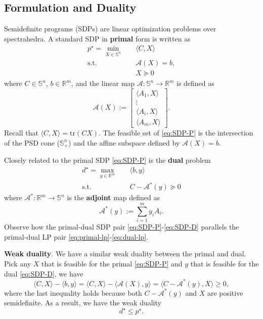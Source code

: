 \documentclass[
]{book}
\theoremstyle{definition}
\theoremstyle{definition}
\theoremstyle{definition}
\theoremstyle{definition}
\theoremstyle{remark}
\begin{document}
\hypertarget{formulation-and-duality}{%
\subsection{Formulation and Duality}\label{formulation-and-duality}}

Semidefinite programs (SDPs) are linear optimization problems over spectrahedra. A standard SDP in \textbf{primal} form is written as
\begin{equation}
\boxed{
\begin{split}
p^\star = \min_{X \in \mathbb{S}^{n}} & \quad \langle C, X \rangle \\
\mathrm{s.t.}& \quad \mathcal{A}(X) = b, \\
& \quad X \succeq 0
\end{split}
}
\label{eq:SDP-P}
\end{equation}
where \(C \in \mathbb{S}^{n}\), \(b \in \mathbb{R}^{m}\), and the linear map \(\mathcal{A}: \mathbb{S}^{n} \rightarrow \mathbb{R}^{m}\) is defined as
\[
\mathcal{A}(X) := \begin{bmatrix} \langle A_1, X \rangle \\
\vdots \\ \langle A_i, X \rangle \\ \langle A_m, X \rangle \end{bmatrix}.
\]
Recall that \(\langle C, X \rangle = \mathrm{tr}(CX)\). The feasible set of \eqref{eq:SDP-P} is the intersection of the PSD cone (\(\mathbb{S}^{n}_{+}\)) and the affine subspace defined by \(\mathcal{A}(X) = b\).

Closely related to the primal SDP \eqref{eq:SDP-P} is the \textbf{dual} problem
\begin{equation}
\boxed{
\begin{split}
d^\star = \max_{y \in \mathbb{R}^{m}} & \quad \langle b, y \rangle \\
\mathrm{s.t.}& \quad C - \mathcal{A}^* (y) \succeq 0
\end{split}
}
\label{eq:SDP-D}
\end{equation}
where \(\mathcal{A}^{*}: \mathbb{R}^{m} \rightarrow \mathbb{S}^{n}\) is the \textbf{adjoint} map defined as
\[
\mathcal{A}^*(y) := \sum_{i=1}^m y_i A_i.
\]
Observe how the primal-dual SDP pair \eqref{eq:SDP-P}-\eqref{eq:SDP-D} parallels the primal-dual LP pair \eqref{eq:primal-lp}-\eqref{eq:dual-lp}.

\textbf{Weak duality}. We have a similar weak duality between the primal and dual. Pick any \(X\) that is feasible for the primal \eqref{eq:SDP-P} and \(y\) that is feasible for the dual \eqref{eq:SDP-D}, we have
\[
\boxed{\langle C, X \rangle - \langle b, y \rangle = \langle C, X \rangle - \langle \mathcal{A}(X), y \rangle = \langle C - \mathcal{A}^* (y), X \rangle \geq 0,}
\]
where the last inequality holds because both \(C - \mathcal{A}^*(y)\) and \(X\) are positive semidefinite. As a result, we have the weak duality
\[
d^\star \leq p^\star.
\]
\end{document}
